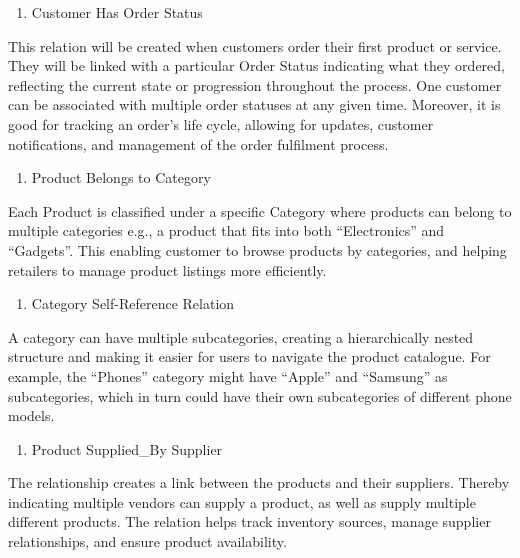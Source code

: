 \documentclass[
]{article}
\providecommand{\tightlist}{%
  \setlength{\itemsep}{0pt}\setlength{\parskip}{0pt}}
\begin{document}
\begin{enumerate}
\def\labelenumi{\arabic{enumi}.}
\setcounter{enumi}{1}
\tightlist
\item
  Customer Has Order Status
\end{enumerate}

This relation will be created when customers order their first product
or service. They will be linked with a particular Order Status
indicating what they ordered, reflecting the current state or
progression throughout the process. One customer can be associated with
multiple order statuses at any given time. Moreover, it is good for
tracking an order's life cycle, allowing for updates, customer
notifications, and management of the order fulfilment process.

\begin{enumerate}
\def\labelenumi{\arabic{enumi}.}
\setcounter{enumi}{2}
\tightlist
\item
  Product Belongs to Category
\end{enumerate}

Each Product is classified under a specific Category where products can
belong to multiple categories e.g., a product that fits into both
``Electronics'' and ``Gadgets''. This enabling customer to browse
products by categories, and helping retailers to manage product listings
more efficiently.

\begin{enumerate}
\def\labelenumi{\arabic{enumi}.}
\setcounter{enumi}{3}
\tightlist
\item
  Category Self-Reference Relation
\end{enumerate}

A category can have multiple subcategories, creating a hierarchically
nested structure and making it easier for users to navigate the product
catalogue. For example, the ``Phones'' category might have ``Apple'' and
``Samsung'' as subcategories, which in turn could have their own
subcategories of different phone models.

\begin{enumerate}
\def\labelenumi{\arabic{enumi}.}
\setcounter{enumi}{4}
\tightlist
\item
  Product Supplied\_By Supplier
\end{enumerate}

The relationship creates a link between the products and their
suppliers. Thereby indicating multiple vendors can supply a product, as
well as supply multiple different products. The relation helps track
inventory sources, manage supplier relationships, and ensure product
availability.
\end{document}
